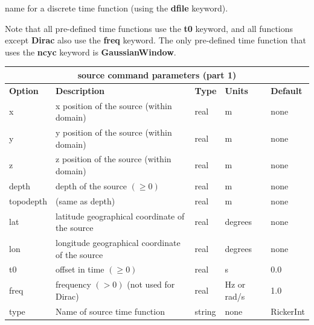 \documentclass[11pt]{report}
\begin{document}
{\begin{itemize}
	      name for a discrete time function (using the {\bf dfile} keyword).
\end{itemize}
Note that all pre-defined time functions use the {\bf t0} keyword, and all functions except {\bf
		Dirac} also use the {\bf freq} keyword. The only pre-defined time function that uses the {\bf
		ncyc} keyword is {\bf GaussianWindow}.
%
\begin{center}
	\begin{tabular}{|l|p{8cm}|l|l|l|} \hline
		\multicolumn{5}{|c|}{\bf source command parameters (part 1)}                                                                \\ \hline
		\bf{Option} & \bf{Description}                                                     & \bf{Type} & \bf{Units}  & \bf{Default} \\ \hline \hline
		x           & x position of the source (within domain)                             & real      & m           & none         \\ \hline
		y           & y position of the source (within domain)                             & real      & m           & none         \\ \hline
		z           & z position of the source (within domain)                             & real      & m           & none         \\ \hline
		\hline
		depth       & depth of the source $(\geq 0)$                                       & real      & m           & none         \\ \hline
		topodepth   & (same as depth)                                                      & real      & m           & none         \\ \hline
		lat         & latitude geographical coordinate of the source                       & real      & degrees     & none         \\ \hline
		lon         & longitude geographical coordinate of the source                      & real      & degrees     & none         \\ \hline
		\hline
		t0          & offset in time $(\geq 0)$                                            & real      & s           & 0.0          \\ \hline
		freq        & frequency $(>0)$ (not used for Dirac)                                & real      & Hz or rad/s & 1.0          \\ \hline
		type        & Name of source time function                                         & string    & none        & RickerInt    \\ \hline

\end{tabular}
\end{center}}
\end{document}
